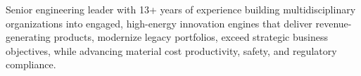 

Senior engineering leader with 13+ years of experience building multidisciplinary organizations into engaged, high-energy innovation engines that deliver revenue-generating products, modernize legacy portfolios, exceed strategic business objectives, while advancing material cost productivity, safety, and regulatory compliance. 


